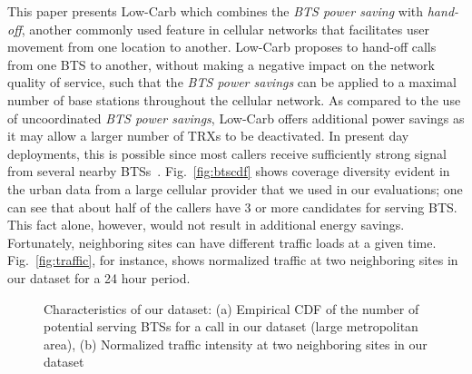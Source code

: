 This paper presents Low-Carb which combines the \textit{BTS
power saving} with \textit{hand-off}, another commonly used
feature in cellular networks that facilitates user movement
from one location to another. Low-Carb proposes to hand-off
calls from one BTS to another, without making a negative impact
on the network quality of service, such that the \textit{BTS
power savings} can be applied to a maximal number of base
stations throughout the cellular network. As compared to the
use of uncoordinated \textit{BTS power savings}, Low-Carb
offers additional power savings as it may allow a larger number
of TRXs to be deactivated. 
In present day deployments, this is possible since most callers
receive sufficiently strong signal from several nearby
BTSs~\cite{Peng:2011:BTSSaving:Mobicom}. Fig.~\ref{fig:btscdf}
shows coverage diversity evident in the urban data from a large
cellular provider that we used in our evaluations; one can see
that about half of the callers have 3 or more candidates for
serving BTS. This fact alone, however, would not result in additional energy savings. Fortunately, neighboring sites can have different traffic loads at a given time. Fig.~\ref{fig:traffic}, for instance, shows normalized traffic at two neighboring sites in our dataset for a 24 hour period.

\begin{figure}
\centering
{}
\caption{Characteristics of our dataset: (a) Empirical CDF of the number of potential serving BTSs for a call in our dataset (large metropolitan area), (b) Normalized traffic intensity at two neighboring sites in our dataset} 
\label{fig:trafficmodelstats}
\end{figure}

